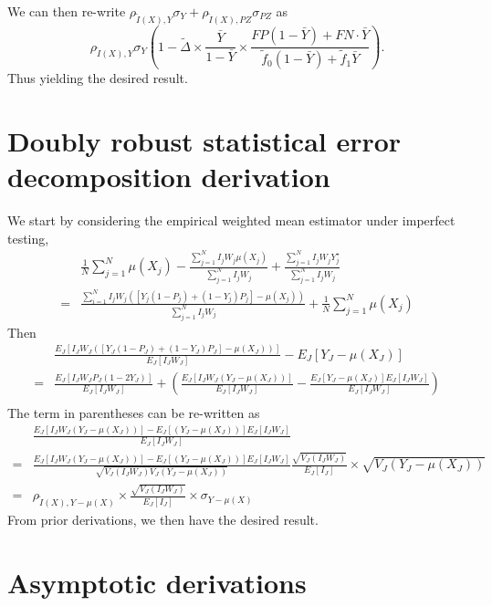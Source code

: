\documentclass[11pt]{amsart}
\numberwithin{equation}{section}
\theoremstyle{plain}
\begin{document}
We can then re-write $\rho_{\tilde I (X),Y} \sigma_Y + \rho_{\tilde I(X),PZ} \sigma_{PZ}$ as
$$
\rho_{\tilde I(X),Y} \sigma_Y \left( 1 - \tilde \Delta \times \frac{\bar Y}{1-\bar Y} \times \frac{FP(1-\bar Y) + FN \cdot \bar Y}{\tilde f_0 (1-\bar Y) + \tilde f_1 \bar Y} \right).
$$
Thus yielding the desired result.

\section{Doubly robust statistical error decomposition derivation}
\label{app:DRderivation}
We start by considering the empirical weighted mean estimator under imperfect testing,
\begin{align*}
&\frac{1}{N} \sum_{j=1}^N \mu(X_j) - \frac{\sum_{j=1}^N I_j W_j \mu(X_j)}{\sum_{j=1}^N I_j W_j} + \frac{\sum_{j=1}^N I_j W_j Y_j^\star}{\sum_{j=1}^N I_j W_j} \\
=& \frac{\sum_{i=1}^N  I_j W_j \left( \left[ Y_j (1-P_j) + (1-Y_j) P_j \right] - \mu (X_j) \right)}{\sum_{j=1}^N  I_j W_j } + \frac{1}{N} \sum_{j=1}^N \mu(X_j
)
\end{align*}
Then
$$
\begin{aligned}
&\frac{E_J \left[ I_J W_J \left( \left[ Y_J (1-P_J) + (1-Y_J) P_J \right] - \mu(X_J) \right) \right]}{E_J [ I_J W_J ] } - E_J[Y_J -\mu (X_J)] \\
= &\frac{E_J \left[ I_J W_J P_J (1-2Y_J) \right]}{E_J [ I_J W_J ] } + \left( \frac{E_J [I_J W_J (Y_J -\mu (X_J))]}{E_J [ I_J W_J ] } - \frac{E_J[Y_J-\mu(X_J)] E_J[I_J W_J]}{E_J[I_J W_J]} \right) \\
\end{aligned}
$$
The term in parentheses can be re-written as
$$
\begin{aligned}
&\frac{E_J [I_J W_J (Y_J-\mu(X_J))]- E_J[(Y_J-\mu(X_J))] E_J[I_J W_J]}{E_J[I_J W_J]} \\
=  &\frac{E_J [I_J W_J (Y_J-\mu(X_J))]- E_J[(Y_J-\mu(X_J))] E_J[I_J W_J]}{\sqrt{V_J(I_J W_J) V_J(Y_J-\mu(X_J))}} \frac{\sqrt{V_J(I_J W_J)}}{E_J[I_J]} \times \sqrt{V_J(Y_J-\mu(X_J))} \\
= &\rho_{\tilde I (X),Y-\mu(X)} \times \frac{\sqrt{V_J(I_J W_J)}}{E_J[I_J]} \times \sigma_{Y-\mu(X)}
\end{aligned}
$$
From prior derivations, we then have the desired result.

\section{Asymptotic derivations}
\label{app:asympderivations}
\end{document}
